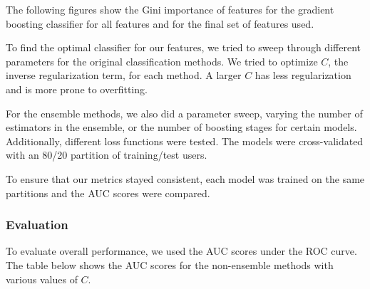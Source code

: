 \documentclass{article} %
\begin{document}
The following figures show the Gini importance of features for the gradient boosting classifier for all features and for the final set of features used.

\begin{figure}[h]
    \centering
    \qquad
\end{figure}

To find the optimal classifier for our features, we tried to sweep through different parameters for the original classification methods.
We tried to optimize $C$, the inverse regularization term, for each method.
A larger $C$ has less regularization and is more prone to overfitting.

For the ensemble methods, we also did a parameter sweep, varying the number of estimators in the ensemble, or the number of boosting stages for certain models.
Additionally, different loss functions were tested.
The models were cross-validated with an 80/20 partition of training/test users.

To ensure that our metrics stayed consistent, each model was trained on the same partitions and the AUC scores were compared.

\subsubsection{Evaluation}

To evaluate overall performance, we used the AUC scores under the ROC curve.
The table below shows the AUC scores for the non-ensemble methods with various values of $C$.
\end{document}
